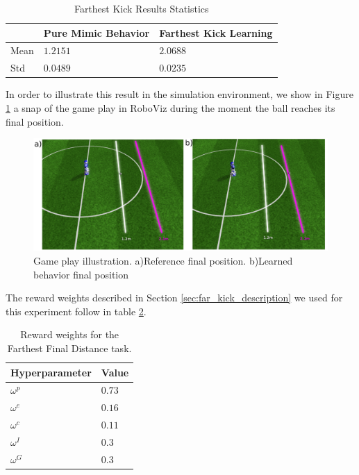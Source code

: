 \begin{table}[ht]
    \begin{tabular}{|l|l|l|}
    \hline
      &     Pure Mimic Behavior  &    Farthest Kick Learning  \\ \hline
    Mean             &    $1.2151$  &   $2.0688$    \\
    Std              &    $0.0489$   &  $0.0235$   \\ \hline
    \end{tabular}
\centering
\caption{Farthest Kick Results Statistics}
\label{tab:ppo_far_kick_stat}
\end{table}

In order to illustrate this result in the simulation environment, we show in Figure \ref{fig:RL_far_kick_roboviz} a snap of the game play in RoboViz during the moment the ball reaches its final position. 

\begin{figure}[H]
    \centering
    \includegraphics[width=1.0\textwidth]{Chapter7/figures/kick_far.pdf} 
    \caption{Game play illustration. a)Reference final position. b)Learned behavior final position}
    \label{fig:RL_far_kick_roboviz}
\end{figure}

The reward weights described in Section \ref{sec:far_kick_description} we used for this experiment follow in table \ref{tab:weights_far_kick}.

\begin{table}[ht]
    \begin{tabular}{|l|l|}
    \hline
    Hyperparameter            & Value    \\ \hline
    $\omega^p$ 	              & $0.73$ \\
    $\omega^e$                  & $0.16$     \\
    $\omega^c$                & $0.11$     \\
    $\omega^I$					&	$0.3$  	\\
    $\omega^G$					& 	$0.3$		\\
    \hline
    \end{tabular}
\centering
\caption{Reward weights for the Farthest Final Distance task.}
\label{tab:weights_far_kick}
\end{table}

